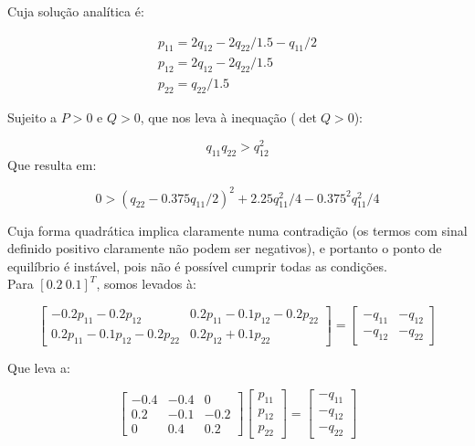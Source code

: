 Cuja solução analítica é:

\begin{equation}
\begin{array}{l}
p_{11} = 2q_{12} - 2q_{22}/1.5 - q_{11}/2\\
p_{12} = 2q_{12} - 2q_{22}/1.5\\
p_{22} = q_{22}/1.5
\end{array}
\end{equation}

Sujeito a $P>0$ e $Q>0$, que nos leva à inequação ($\det Q>0$):

\begin{equation}
q_{11}q_{22}>q_{12}^2 
\end{equation}
Que resulta em:

\begin{equation}
0>(q_{22} - 0.375q_{11}/2)^2 + 2.25q_{11}^2/4 - 0.375^2q_{11}^2/4
\end{equation}

Cuja forma quadrática implica claramente numa contradição (os termos com sinal definido positivo claramente não podem ser negativos), e portanto o ponto de equilíbrio é instável, pois não é possível cumprir todas as condições.\\

Para $[0.2~0.1]^T$, somos levados à:

\begin{equation}
\begin{bmatrix}
-0.2p_{11} - 0.2p_{12} & 0.2p_{11}-0.1p_{12}-0.2p_{22}\\
0.2p_{11}-0.1p_{12}-0.2p_{22}& 0.2p_{12} + 0.1p_{22}
\end{bmatrix}
=
\begin{bmatrix}
-q_{11} & -q_{12}\\
-q_{12} & -q_{22}
\end{bmatrix}
\end{equation}

Que leva a:

\begin{equation}
\begin{bmatrix}
-0.4 & -0.4 & 0\\
0.2  & -0.1 & -0.2\\
0    & 0.4 &  0.2
\end{bmatrix}
\begin{bmatrix}
p_{11}\\
p_{12}\\
p_{22}
\end{bmatrix}
=
\begin{bmatrix}
-q_{11}\\
-q_{12}\\
-q_{22}
\end{bmatrix}
\end{equation}


